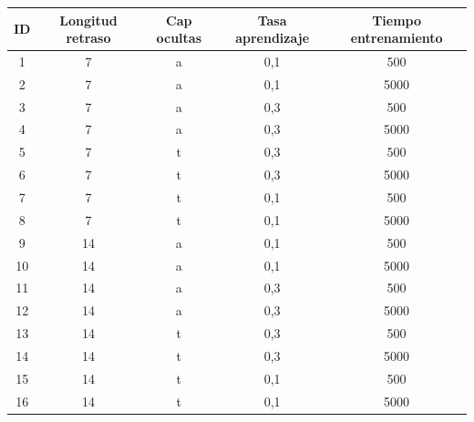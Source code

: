 \documentclass[12pt,a4paper, xcolor=table]{article}
\begin{document}
    \begin{table}[h]
    \begin{tabular}{|c|c|c|c|c|}
    \hline
    \rowcolor[HTML]{DAE8FC}
    \textbf{ID} & \textbf{Longitud retraso} & \textbf{Cap ocultas} & \textbf{Tasa aprendizaje} & \textbf{Tiempo entrenamiento} \\ \hline
    1                       & 7                   & a                      & 0,1                    & 500                    \\ \hline
    2                       & 7                   & a                      & 0,1                    & 5000                   \\ \hline
    3                       & 7                   & a                      & 0,3                    & 500                    \\ \hline
    4                       & 7                   & a                      & 0,3                    & 5000                   \\ \hline
    5                       & 7                   & t                      & 0,3                    & 500                    \\ \hline
    6                       & 7                   & t                      & 0,3                    & 5000                   \\ \hline
    7                       & 7                   & t                      & 0,1                    & 500                    \\ \hline
    8                       & 7                   & t                      & 0,1                    & 5000                   \\ \hline
    9                       & 14                  & a                      & 0,1                    & 500                    \\ \hline
    10                      & 14                  & a                      & 0,1                    & 5000                   \\ \hline
    11                      & 14                  & a                      & 0,3                    & 500                    \\ \hline
    12                      & 14                  & a                      & 0,3                    & 5000                   \\ \hline
    13                      & 14                  & t                      & 0,3                    & 500                    \\ \hline
    14                      & 14                  & t                      & 0,3                    & 5000                   \\ \hline
    15                      & 14                  & t                      & 0,1                    & 500                    \\ \hline
    16                      & 14                  & t                      & 0,1                    & 5000                   \\ \hline
    \end{tabular}
    \end{table}
\end{document}
